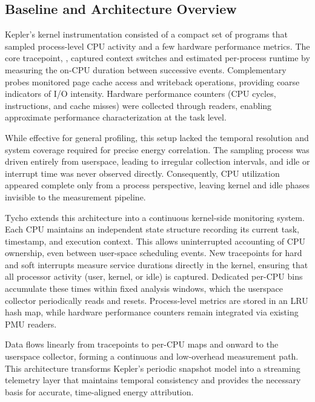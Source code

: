 \subsection{Baseline and Architecture Overview}
\label{subsec:ebpf-collector-overview}

Kepler’s kernel instrumentation consisted of a compact set of  programs that sampled process-level CPU activity and a few hardware performance metrics.  
The core tracepoint, , captured context switches and estimated per-process runtime by measuring the on-CPU duration between successive events.  
Complementary probes monitored page cache access and writeback operations, providing coarse indicators of I/O intensity.  
Hardware performance counters (CPU cycles, instructions, and cache misses) were collected through  readers, enabling approximate performance characterization at the task level.

While effective for general profiling, this setup lacked the temporal resolution and system coverage required for precise energy correlation.  
The sampling process was driven entirely from userspace, leading to irregular collection intervals, and idle or interrupt time was never observed directly.  
Consequently, CPU utilization appeared complete only from a process perspective, leaving kernel and idle phases invisible to the measurement pipeline.

Tycho extends this architecture into a continuous kernel-side monitoring system.  
Each CPU maintains an independent state structure recording its current task, timestamp, and execution context.  
This allows uninterrupted accounting of CPU ownership, even between user-space scheduling events.  
New tracepoints for hard and soft interrupts measure service durations directly in the kernel, ensuring that all processor activity (user, kernel, or idle) is captured.  
Dedicated per-CPU bins accumulate these times within fixed analysis windows, which the userspace collector periodically reads and resets.  
Process-level metrics are stored in an LRU hash map, while hardware performance counters remain integrated via existing PMU readers.

Data flows linearly from tracepoints to per-CPU maps and onward to the userspace collector, forming a continuous and low-overhead measurement path.  
This architecture transforms Kepler’s periodic snapshot model into a streaming telemetry layer that maintains temporal consistency and provides the necessary basis for accurate, time-aligned energy attribution.

